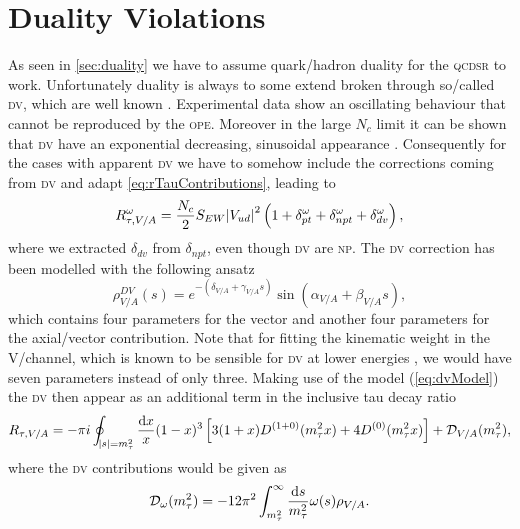 \documentclass[../../index.tex]{subfiles}
\begin{document}
\section{Duality Violations}
As seen in \cref{sec:duality} we have to assume quark\-/hadron duality for the
\textsc{qcdsr} to work. Unfortunately duality is always to some extend broken
through so\-/called \textsc{dv}, which are well known
\cite{Cata2008,Cata2009}. Experimental data show an oscillating behaviour that
cannot be reproduced by the \textsc{ope}. Moreover in the large \(N_c\) limit it
can be shown that \textsc{dv} have an exponential decreasing, sinusoidal
appearance \cite{Cata2005}. Consequently for the cases with apparent \textsc{dv}
we have to somehow include the corrections coming from \textsc{dv} and adapt
\cref{eq:rTauContributions}, leading to
\begin{equation}
  R_{\tau,V/A}^\omega = \frac{N_c}{2}S_{EW} \abs{V_{ud}}^2 \left( 1 + \delta_{pt}^{\omega} + \delta_{npt}^{\omega} + \delta_{dv}^{\omega} \right),
\end{equation}
where we extracted \(\delta_{dv}\) from \(\delta_{npt}\), even though
\textsc{dv} are \textsc{np}. The \textsc{dv} correction has been modelled with
the following ansatz \cite{Cata2009}
\begin{equation}
  \label{eq:dvModel}
  \rho_{V/A}^{DV}(s) = e^{-(\delta_{V/A}+\gamma_{V/A}s)} \sin(\alpha_{V/A} + \beta_{V/A}s),
\end{equation}
which contains four parameters for the vector and another four parameters for
the axial\-/vector contribution. Note that for fitting the kinematic weight in
the \textsc{V}\-/channel, which is known to be sensible for \textsc{dv} at lower
energies \cite{Boito2011a}, we would have seven parameters instead of only
three. Making use of the model (\cref{eq:dvModel}) the \textsc{dv} then appear
as an additional term in the inclusive tau decay ratio
\begin{equation}
  R_{\tau,V/A} = - \pi i \oint_{\abs{s}=m_\tau^2} \frac{\dif x}{x} (1 - x)^3 \left[ 3
    (1 + x) D^{(1+0)}(m_\tau^2 x) + 4 D^{(0)}(m_\tau^2 x) \right] +  \mathcal{D}_{V/A}(m_\tau^2),
\end{equation}
where the \textsc{dv} contributions would be given as
\begin{equation}
  \mathcal{D}_\omega(m_\tau^2) = -12 \pi^2 \int_{m_\tau^2}^\infty \frac{\dif s}{m_\tau^2} \omega(s) \rho_{V/A}.
\end{equation}
\end{document}
